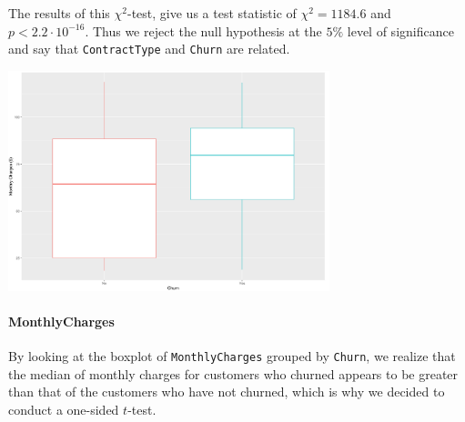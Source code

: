 \documentclass[man, floatsintext]{apa6}
\begin{document}
\hspace{0.5mm}

The results of this $\chi^2$-test, give us a test statistic of $\chi^2 = 1184.6$ and $p < 2.2 \cdot 10^{-16}$. Thus we reject the null hypothesis at the $5 \%$ level of significance and say that \texttt{ContractType} and \texttt{Churn} are related.

\hspace{0.5mm}

\noindent\begin{minipage}{0.54\textwidth}
\includegraphics[width = \linewidth, height = 64mm]{boxplot_MonthlyChargesvsChurn}
\end{minipage}
\hfill
\begin{minipage}{0.43\textwidth}
   \paragraph{MonthlyCharges}
   By looking at the boxplot of \texttt{MonthlyCharges} grouped by \texttt{Churn}, we realize that the median of monthly charges for customers who churned appears to be greater than that of the customers who have not churned, which is why we decided to conduct a one-sided $t$-test.\\
\end{minipage}
\end{document}
